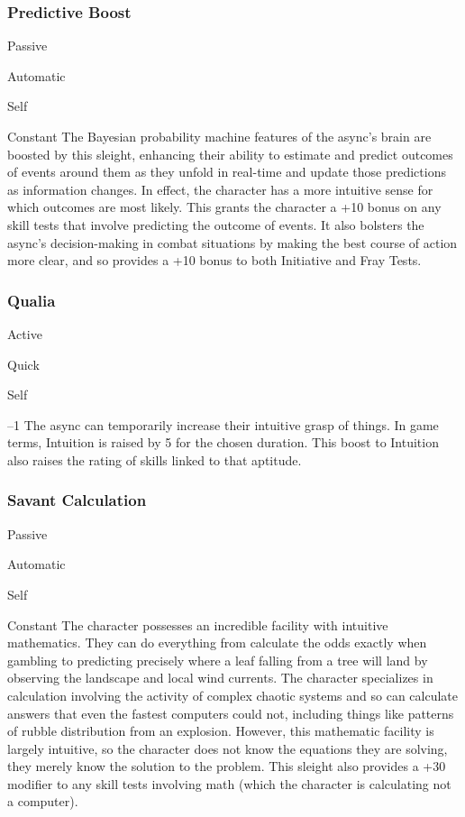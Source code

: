 \subsubsection{Predictive Boost}


  

Passive

   Automatic

 Self

   Constant
The Bayesian probability machine features of the 
async's brain are boosted by this sleight, enhancing 
their ability to estimate and predict outcomes of 
events around them as they unfold in real-time and 
update those predictions as information changes. 
In effect, the character has a more intuitive sense 
for which outcomes are most likely. This grants the 
character a +10 bonus on any skill tests that involve 
predicting the outcome of events. It also bolsters 
the async's decision-making in combat situations by 
making the best course of action more clear, and so 
provides a +10 bonus to both Initiative and Fray Tests.

\subsubsection{Qualia}


  

Active

   Quick

 Self

  

   –1
The async can temporarily increase their intuitive 
grasp of things. In game terms, Intuition is raised by 
5 for the chosen duration. This boost to Intuition also 
raises the rating of skills linked to that aptitude.

\subsubsection{Savant Calculation}


  

Passive

   Automatic

 Self

   Constant
The character possesses an incredible facility with 
intuitive mathematics. They can do everything from 
calculate the odds exactly when gambling to predicting
precisely where a leaf falling from a tree will land
by observing the landscape and local wind currents. 
The character specializes in calculation involving the 
activity of complex chaotic systems and so can calculate
answers that even the fastest computers could not,
including things like patterns of rubble distribution 
from an explosion. However, this mathematic facility 
is largely intuitive, so the character does not know the 
equations they are solving, they merely know the solution
to the problem.
This sleight also provides a +30 modifier to any 
skill tests involving math (which the character is calculating
not a computer).

